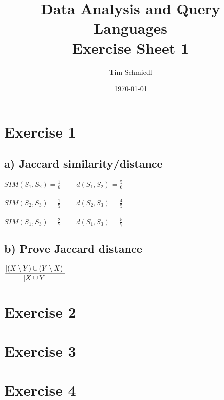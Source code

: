 \documentclass{article}
\begin{document}
\title{Data Analysis and Query Languages \\
 Exercise Sheet 1}
\date{\today}
\author{Tim Schmiedl}
\maketitle

\section*{Exercise 1}

\subsection*{a) Jaccard similarity/distance}
$SIM(S_1,S_2) = \frac{1}{6} \;\;\;\;\;\;\;\; d(S_1,S_2) = \frac{5}{6}$\\
\\
$SIM(S_2,S_3) = \frac{1}{5} \;\;\;\;\;\;\;\; d(S_2,S_3) = \frac{4}{5}$\\
\\
$SIM(S_1,S_3) = \frac{2}{7} \;\;\;\;\;\;\;\; d(S_1,S_3) = \frac{5}{7}$

\vspace{1cm}
\subsection*{b) Prove Jaccard distance}
$\mathlarger{
\frac{|(X \setminus Y) \cup (Y \setminus X) |}{| X \cup Y |}
}$

\vspace{1cm}
\section*{Exercise 2}



\vspace{1cm}
\section*{Exercise 3}



\vspace{1cm}
\section*{Exercise 4}
\end{document}
